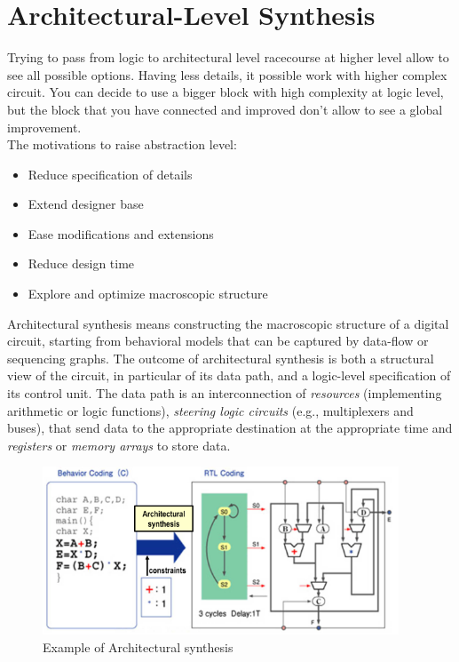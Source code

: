 \section{Architectural-Level Synthesis}
Trying to pass from logic to architectural level racecourse at higher level allow to see all possible options. Having less details, it possible work with higher complex circuit. You can decide to use a bigger block with high complexity at logic level, but the block that you have connected and improved don't allow to see a global improvement.\\
The motivations to raise abstraction level:
\begin{itemize}
\item Reduce specification of details
\item Extend designer base
\item Ease modifications and extensions
\item Reduce design time
\item Explore and optimize macroscopic structure
\end{itemize}
Architectural synthesis means constructing the macroscopic structure of a digital circuit, starting from behavioral models that can be captured by data-flow or sequencing graphs. The outcome of architectural synthesis is both a structural view of the circuit, in particular of its data path, and a logic-level specification of its control unit. The data path is an interconnection of  \textit{resources} (implementing arithmetic or logic functions), \textit{steering logic circuits}  (e.g., multiplexers and buses), that send data to the appropriate destination at the appropriate time and  \textit{registers}  or  \textit{memory arrays}  to store data.
\begin{figure}[H]
	 \centering
	 \includegraphics[height=50mm]{./Cap3/Images/Image01.png}
	 \caption[Optional caption]{Example of Architectural synthesis}
	 \label{fig:archSy}
\end{figure}

